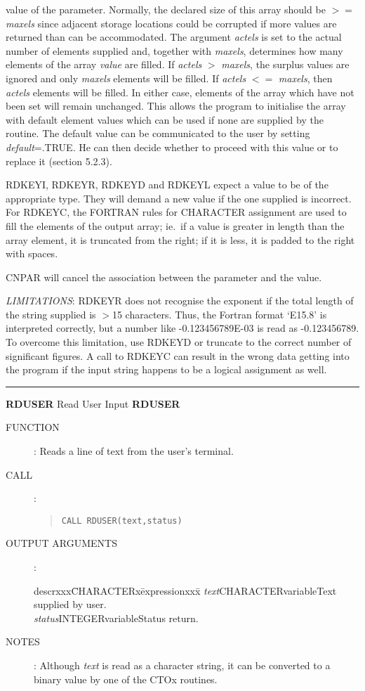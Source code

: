 \documentclass{article}
\begin{document}
\begin{description}
value of the parameter.
Normally, the declared size of this array should be $>=$ {\em maxels} since adjacent
storage locations could be corrupted if more values are returned than can be
accommodated.
The argument {\em actels} is set to the actual number of elements supplied and,
together with {\em maxels}, determines how many elements of the array
{\em value} are filled.
If {\em actels} $>$ {\em maxels}, the surplus values are ignored and only
{\em maxels} elements will be filled.
If {\em actels} $<=$ {\em maxels}, then {\em actels} elements will be filled.
In either case, elements of the array which have not been set will remain
unchanged.
This allows the program to initialise the array with default element values
which can be used if none are supplied by the routine.
The default value can be communicated to the user by setting {\em default}=.TRUE.
He can then decide whether to proceed with this value or to replace it
(section 5.2.3).

RDKEYI, RDKEYR, RDKEYD and  RDKEYL expect a value to be of the appropriate type.
They will demand a new value if the one supplied is incorrect.
For RDKEYC, the FORTRAN rules for CHARACTER assignment are used to fill the
elements of the output array; ie.\ if a value is greater in length than the array
element, it is truncated from the right; if it is less, it is padded to the
right with spaces.

CNPAR will cancel the association between the parameter and the value.

{\em LIMITATIONS}: RDKEYR does not recognise the exponent if the total length of the
string supplied is $>$15 characters.
Thus, the Fortran format `E15.8' is interpreted correctly, but a number
like -0.123456789E-03 is read as -0.123456789.
To overcome this limitation, use RDKEYD or truncate to the correct number of
significant figures.
A call to RDKEYC can result in the wrong data getting into the program if the
input string happens to be a logical assignment as well.
\end{description}
\rule{\textwidth}{0.3mm}
{\Large {\bf RDUSER} \hfill Read User Input \hfill {\bf RDUSER}}
\begin{description}
\item [FUNCTION]:
Reads a line  of  text  from  the  user's  terminal.
\item [CALL]:
\begin{quote}
{\tt CALL RDUSER(text,status)}
\end{quote}
\item [OUTPUT ARGUMENTS]:
\begin{tabbing}
descrxxx\=CHARACTERx\=expressionxxx\=\kill
{\em text}\>CHARACTER\>variable\>Text supplied by user.\\
{\em status}\>INTEGER\>variable\>Status return.
\end{tabbing}
\item [NOTES]:
Although {\em text} is read as a character string, it can be converted to a binary
value by one of the CTOx routines.
\end{description}
\end{document}
